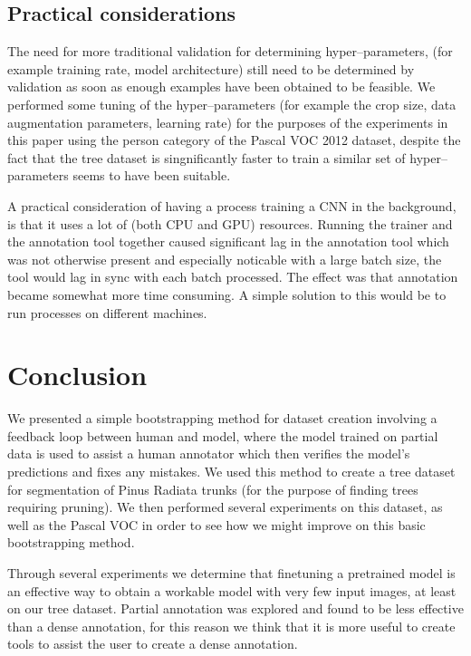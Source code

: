\documentclass{article}
\begin{document}
\subsection{Practical considerations}


The need for more traditional validation for determining hyper--parameters, (for example training rate, model architecture) still need to be determined by validation as soon as enough examples have been obtained to be feasible. We performed some tuning of the hyper--parameters (for example the crop size, data augmentation parameters, learning rate) for the purposes of the experiments in this paper using the person category of the Pascal \gls{VOC} 2012 dataset, despite the fact that the tree dataset is singnificantly faster to train a similar set of hyper--parameters seems to have been suitable.


A practical consideration of having a process training a \gls{CNN} in the background, is that it uses a lot of (both CPU and GPU) resources. Running the trainer and the annotation tool together caused significant lag in the annotation tool which was not otherwise present and especially noticable with a large batch size, the tool would lag in sync with each batch processed. The effect was that annotation became somewhat more time consuming. A simple solution to this would be to run processes on different machines.




\section {Conclusion}

We presented a simple bootstrapping method for dataset creation involving a feedback loop between human and model, where the model trained on partial data is used to assist a human annotator which then verifies the model's predictions and fixes any mistakes. We used this method to create a tree dataset for segmentation of Pinus Radiata trunks (for the purpose of finding trees requiring pruning). We then performed several experiments on this dataset, as well as the Pascal VOC in order to see how we might improve on this basic bootstrapping method. 

Through several experiments we determine that finetuning a pretrained model is an effective way to obtain a workable model with very few input images, at least on our tree dataset. Partial annotation was explored and found to be less effective than a dense annotation, for this reason we think that it is more useful to create tools to assist the user to create a dense annotation.
\end{document}
